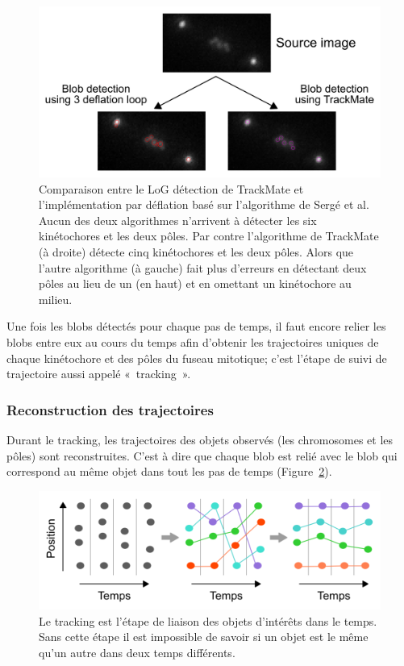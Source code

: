 \documentclass[12pt,a4paper,twoside,openright]{book}
\begin{document}
\begin{figure}[htbp]
\centering
\includegraphics{figures/results/imaging/compare.png}
\caption[Principe de l'algorithme de détection de blob par déflation]{\label{fig:compare}Comparaison
entre le LoG détection de TrackMate et l'implémentation par déflation
basé sur l'algorithme de Sergé et al. Aucun des deux algorithmes
n'arrivent à détecter les six kinétochores et les deux pôles. Par contre
l'algorithme de TrackMate (à droite) détecte cinq kinétochores et les
deux pôles. Alors que l'autre algorithme (à gauche) fait plus d'erreurs
en détectant deux pôles au lieu de un (en haut) et en omettant un
kinétochore au milieu.}
\end{figure}

Une fois les blobs détectés pour chaque pas de temps, il faut encore
relier les blobs entre eux au cours du temps afin d'obtenir les
trajectoires uniques de chaque kinétochore et des pôles du fuseau
mitotique; c'est l'étape de suivi de trajectoire aussi appelé
«~tracking~».

\subsubsection{Reconstruction des
trajectoires}\label{reconstruction-des-trajectoires}

Durant le tracking, les trajectoires des objets observés (les
chromosomes et les pôles) sont reconstruites. C'est à dire que chaque
blob est relié avec le blob qui correspond au même objet dans tout les
pas de temps (Figure~\ref{fig:whatistracking}).

\begin{figure}[htbp]
\centering
\includegraphics{figures/results/imaging/whatistracking.png}
\caption[Le tracking est l'étape de liaison des objets d'intérêts dans le temps]{\label{fig:whatistracking}Le
tracking est l'étape de liaison des objets d'intérêts dans le temps.
Sans cette étape il est impossible de savoir si un objet est le même
qu'un autre dans deux temps différents.}
\end{figure}
\end{document}
